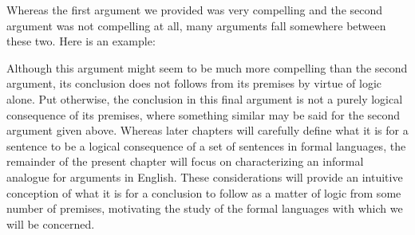
Whereas the first argument we provided was very compelling and the second argument was not compelling at all, many arguments fall somewhere between these two.
Here is an example:



\begin{earg}
\end{earg}
 
 
Although this argument might seem to be much more compelling than the second argument, its conclusion does not follows from its premises by virtue of logic alone. 
Put otherwise, the conclusion in this final argument is not a purely logical consequence of its premises, where something similar may be said for the second argument given above.
Whereas later chapters will carefully define what it is for a sentence to be a logical consequence of a set of sentences in formal languages, the remainder of the present chapter will focus on characterizing an informal analogue for arguments in English.
These considerations will provide an intuitive conception of what it is for a conclusion to follow as a matter of logic from some number of premises, motivating the study of the formal languages with which we will be concerned.

